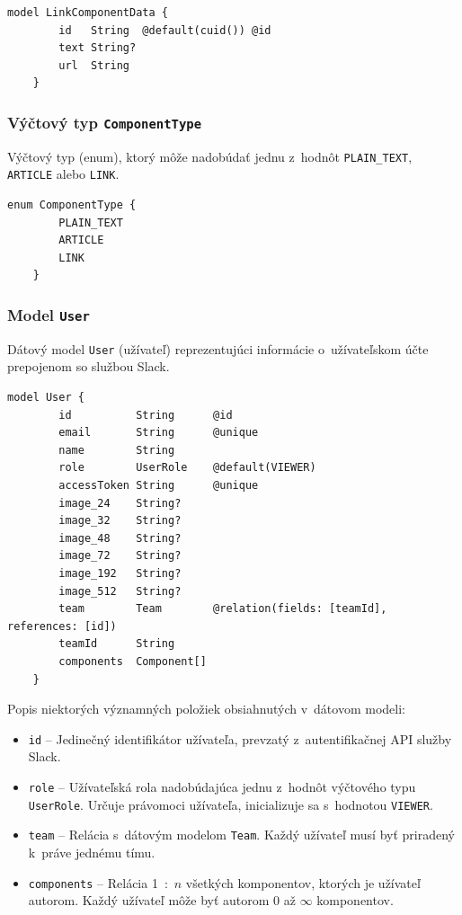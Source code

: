 \begin{lstlisting}[language={Prisma}, caption=Dátový model \texttt{LinkComponentData} v~konfiguračnom súbore \texttt{prisma}.]
	model LinkComponentData {
		id   String  @default(cuid()) @id
		text String?
		url  String
	}
\end{lstlisting}

\subsubsection{Výčtový typ \texttt{ComponentType}}
Výčtový typ (enum), ktorý môže nadobúdať jednu z~hodnôt \texttt{PLAIN\_TEXT}, \texttt{ARTICLE} alebo \texttt{LINK}. \\

\begin{lstlisting}[language={Prisma}, caption=Výčtový typ \texttt{ComponentType} v~konfiguračnom súbore \texttt{prisma}.]
	enum ComponentType {
		PLAIN_TEXT
		ARTICLE
		LINK
	}
\end{lstlisting}

\subsubsection{Model \texttt{User}}
Dátový model \texttt{User} (užívateľ) reprezentujúci informácie o~užívateľskom účte prepojenom so službou Slack. \\

\begin{lstlisting}[language={Prisma}, caption=Dátový model \texttt{User} v~konfiguračnom súbore \texttt{prisma}.]
	model User {
		id          String      @id
		email       String      @unique
		name        String
		role        UserRole    @default(VIEWER)
		accessToken String      @unique
		image_24    String?
		image_32    String?
		image_48    String?
		image_72    String?
		image_192   String?
		image_512   String?
		team        Team        @relation(fields: [teamId], references: [id])
		teamId      String
		components  Component[]
	}
\end{lstlisting}

\medskip

\noindent Popis niektorých významných položiek obsiahnutých v~dátovom modeli:

\begin{itemize}
	\item \texttt{id} -- Jedinečný identifikátor užívateľa, prevzatý z~autentifikačnej API služby Slack.
	\item \texttt{role} -- Užívateľská rola nadobúdajúca jednu z~hodnôt výčtového typu \texttt{UserRole}. Určuje právomoci užívateľa, inicializuje sa s~hodnotou \texttt{VIEWER}.
	\item \texttt{team} -- Relácia s~dátovým modelom \texttt{Team}. Každý užívateľ musí byť priradený k~práve jednému tímu.
	\item \texttt{components} -- Relácia 1~:~$n$ všetkých komponentov, ktorých je užívateľ autorom. Každý užívateľ môže byť autorom 0 až $\infty$ komponentov.
\end{itemize}

